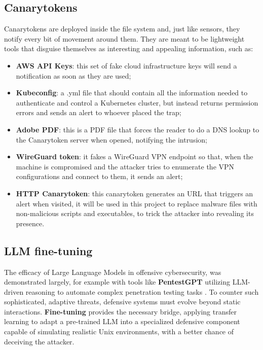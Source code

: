 \documentclass[10pt,a4paper,twocolumn]{article}
\begin{document}
\subsection{Canarytokens}
Canarytokens are deployed inside the file system and, just like sensors, they notify every bit of movement around them. They are meant to be lightweight tools that disguise themselves as interesting and appealing information, such as:
\begin{itemize}
    \item \textbf{AWS API Keys}: this set of fake cloud infrastructure keys will send a notification as soon as they are used;
    \item \textbf{Kubeconfig}: a .yml file that should contain all the information needed to authenticate and control a Kubernetes cluster, but instead returns permission errors and sends an alert to whoever placed the trap;
    \item \textbf{Adobe PDF}: this is a PDF file that forces the reader to do a DNS lookup to the Canarytoken server when opened, notifying the intrusion;
    \item \textbf{WireGuard token}: it fakes a WireGuard VPN endpoint so that, when the machine is compromised and the attacker tries to enumerate the VPN configurations and connect to them, it sends an alert;
    \item \textbf{HTTP Canarytoken}: this canarytoken generates an URL that triggers an alert when visited, it will be used in this project to replace malware files with non-malicious scripts and executables, to trick the attacker into revealing its presence.
\end{itemize}
\cite{CanarytokensGuide}

\subsection{LLM fine-tuning}
The efficacy of Large Language Models in offensive cybersecurity, was demonstrated largely, for example with tools like \textbf{PentestGPT} utilizing LLM-driven reasoning to automate complex penetration testing tasks \cite{PentestGPT}. To counter such sophisticated, adaptive threats, defensive systems must evolve beyond static interactions. \textbf{Fine-tuning} provides the necessary bridge, applying transfer learning to adapt a pre-trained LLM into a specialized defensive component capable of simulating realistic Unix environments, with a better chance of deceiving the attacker.\\ %
\end{document}
